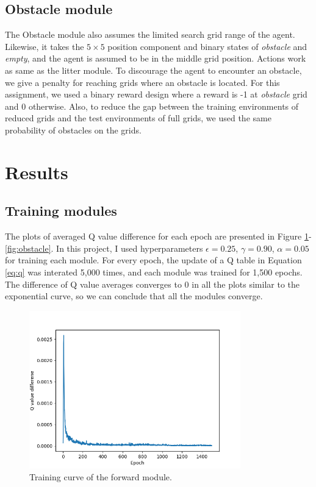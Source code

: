 \documentclass[conference]{IEEEtran}
\begin{document}
\subsection{Obstacle module}
The Obstacle module also assumes the limited search grid range of the agent.
Likewise, it takes the $5 \times 5$ position component and binary states of {\it obstacle} and {\it empty}, and the agent is assumed to be in the middle grid position.
Actions work as same as the litter module.
To discourage the agent to encounter an obstacle, we give a penalty for reaching grids where an obstacle is located.
For this assignment, we used a binary reward design where a reward is -1 at {\it obstacle} grid and 0 otherwise.
Also, to reduce the gap between the training environments of reduced grids and the test environments of full grids, we used the same probability of obstacles on the grids.

\section{Results} %

\subsection{Training modules}

The plots of averaged Q value difference for each epoch are presented in Figure \ref{fig:forward}-\ref{fig:obstacle}.
In this project, I used hyperparameters $\epsilon=0.25$, $\gamma=0.90$, $\alpha=0.05$ for training each module.
For every epoch, the update of a Q table in Equation \ref{eq:q} was interated 5,000 times, and each module was trained for 1,500 epochs.  
The difference of Q value averages converges to 0 in all the plots similar to the exponential curve, so we can conclude that all the modules converge.

\begin{figure}[!t]
	\centering
	\includegraphics[width=3.6in]{forward.png}	
	\caption{Training curve of the forward module.}
	\label{fig:forward}
\end{figure}
\end{document}

